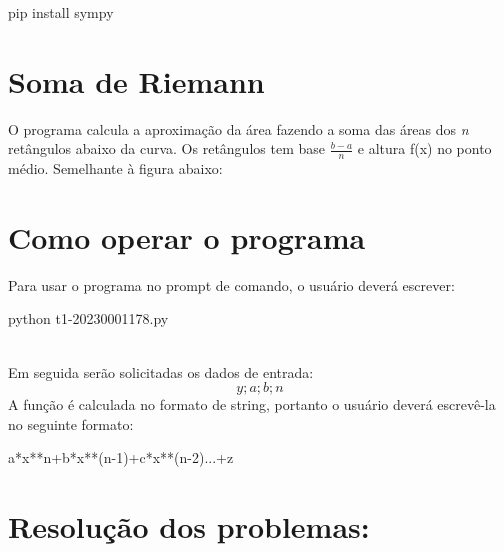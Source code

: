\documentclass{article}
\begin{document}
	\begin{mylist}
pip install sympy
	\end{mylist}
	\newpage
	\section{Soma de Riemann}
	O programa calcula a aproximação da área fazendo a soma das áreas dos \textit{n} retângulos abaixo da curva. Os retângulos tem base $\frac{b-a}{n}$ e altura f(x) no ponto médio. Semelhante à figura abaixo:\\

	\begin{center}
			\end{center}
	\section{Como operar o programa}
	Para usar o programa no prompt de comando, o usuário deverá escrever:
	\begin{mylist}
python t1-20230001178.py
	\end{mylist}\\
	Em seguida serão solicitadas os dados de entrada:
	$$y;a;b;n$$
	A função é calculada no formato de string, portanto o usuário deverá escrevê-la no seguinte formato:
	\begin{mylist}
a*x**n+b*x**(n-1)+c*x**(n-2)...+z
	\end{mylist}
	
	\section{Resolução dos problemas:}
\end{document}
